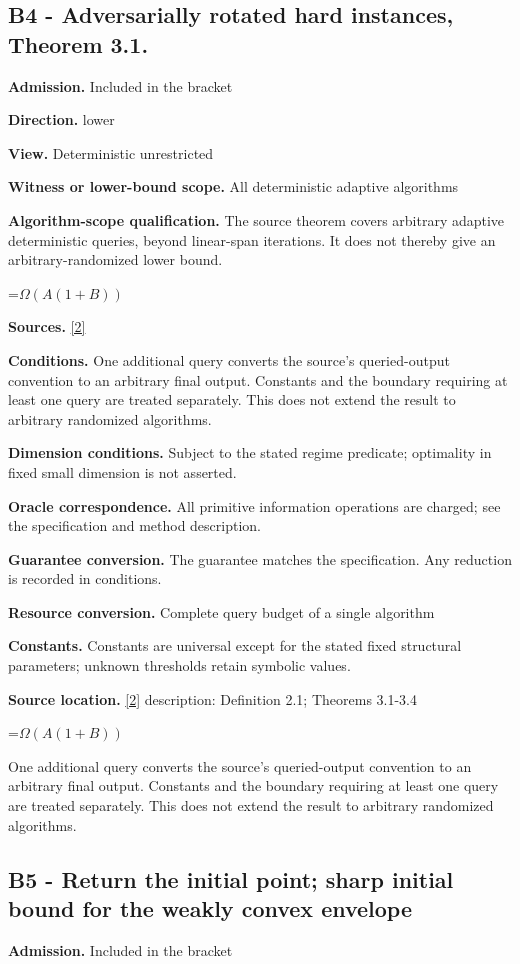 \documentclass[10pt,a4paper]{article}
\newcommand{\AtlasMath}[1]{\par\begingroup\centering\setbox0=\hbox{$\displaystyle #1$}\ifdim\wd0>1.4\linewidth\typeout{ATLAS WIDE FORMULA: \the\wd0}\fi\ifdim\wd0>\linewidth\resizebox{\linewidth}{!}{\box0}\else\box0\fi\par\endgroup}
\begin{document}
\subsection{B4 - Adversarially rotated hard instances, Theorem 3.1.}
\textbf{Admission.} Included in the bracket

\textbf{Direction.} lower

\textbf{View.} Deterministic unrestricted

\textbf{Witness or lower-bound scope.} All deterministic adaptive algorithms

\textbf{Algorithm-scope qualification.} The source theorem covers arbitrary adaptive deterministic queries, beyond linear-span iterations. It does not thereby give an arbitrary-randomized lower bound.

\AtlasMath{\Omega(A(1+B))}
\textbf{Sources.} \href{https://arxiv.org/pdf/2609.14235v2}{[2]}

\textbf{Conditions.} One additional query converts the source’s queried-output convention to an arbitrary final output. Constants and the boundary requiring at least one query are treated separately. This does not extend the result to arbitrary randomized algorithms.

\textbf{Dimension conditions.} Subject to the stated regime predicate; optimality in fixed small dimension is not asserted.

\textbf{Oracle correspondence.} All primitive information operations are charged; see the specification and method description.

\textbf{Guarantee conversion.} The guarantee matches the specification. Any reduction is recorded in conditions.

\textbf{Resource conversion.} Complete query budget of a single algorithm

\textbf{Constants.} Constants are universal except for the stated fixed structural parameters; unknown thresholds retain symbolic values.

\textbf{Source location.} \href{https://arxiv.org/pdf/2609.14235v2}{[2]} description: Definition 2.1; Theorems 3.1-3.4

\AtlasMath{\Omega(A(1+B))}
One additional query converts the source’s queried-output convention to an arbitrary final output. Constants and the boundary requiring at least one query are treated separately. This does not extend the result to arbitrary randomized algorithms.

\subsection{B5 - Return the initial point; sharp initial bound for the weakly convex envelope}
\textbf{Admission.} Included in the bracket
\end{document}
